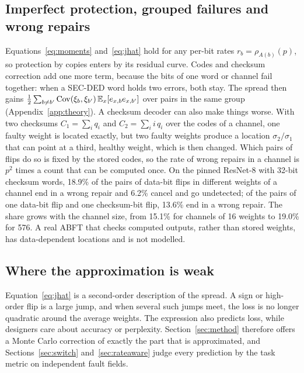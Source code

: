 \subsection{Imperfect protection, grouped failures and wrong repairs}\label{sec:theory-abft}
Equations~\eqref{eq:moments} and~\eqref{eq:jhat} hold for any per-bit rates $r_b=\rho_{A(b)}(p)$, so protection by copies enters by its residual curve. Codes and checksum correction add one more term, because the bits of one word or channel fail together: when a SEC-DED word holds two errors, both stay. The spread then gains $\tfrac12\sum_{b\ne b'}\mathrm{Cov}(\xi_b,\xi_{b'})\,\mathbb{E}_x[e_{x,b}e_{x,b'}]$ over pairs in the same group (Appendix~\ref{app:theory}). A checksum decoder can also make things worse. With two checksums $C_1=\sum_iq_i$ and $C_2=\sum_i i\,q_i$ over the codes of a channel, one faulty weight is located exactly, but two faulty weights produce a location $\sigma_2/\sigma_1$ that can point at a third, healthy weight, which is then changed. Which pairs of flips do so is fixed by the stored codes, so the rate of wrong repairs in a channel is $p^2$ times a count that can be computed once. On the pinned ResNet-8 with 32-bit checksum words, 18.9\% of the pairs of data-bit flips in different weights of a channel end in a wrong repair and 6.2\% cancel and go undetected; of the pairs of one data-bit flip and one checksum-bit flip, 13.6\% end in a wrong repair. The share grows with the channel size, from 15.1\% for channels of 16 weights to 19.0\% for 576. A real ABFT that checks computed outputs, rather than stored weights, has data-dependent locations and is not modelled.

\subsection{Where the approximation is weak}
Equation~\eqref{eq:jhat} is a second-order description of the spread. A sign or high-order flip is a large jump, and when several such jumps meet, the loss is no longer quadratic around the average weights. The expression also predicts loss, while designers care about accuracy or perplexity. Section~\ref{sec:method} therefore offers a Monte Carlo correction of exactly the part that is approximated, and Sections~\ref{sec:switch} and~\ref{sec:rateaware} judge every prediction by the task metric on independent fault fields.
